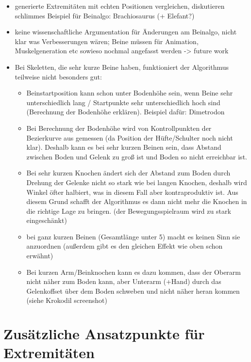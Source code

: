 \begin{itemize}
 \item generierte Extremitäten mit echten Positionen vergleichen, diskutieren\\
    schlimmes Beispiel für Beinalgo: Brachiosaurus (+ Elefant?)
 \item keine wissenschaftliche Argumentation für Änderungen am Beinalgo, nicht klar was Verbesserungen wären; Beine müssen für Animation, Muskelgeneration etc sowieso nochmal angefasst werden -> future work
 \item Bei Skeletten, die sehr kurze Beine haben, funktioniert der Algorithmus teilweise nicht besonders gut:
  \begin{itemize}
   \item Beinstartposition kann schon unter Bodenhöhe sein, wenn Beine sehr unterschiedlich lang / Startpunkte sehr unterschiedlich hoch sind (Berechnung der Bodenhöhe erklären). Beispiel dafür: Dimetrodon
   \item Bei Berechnung der Bodenhöhe wird von Kontrollpunkten der Bezierkurve aus gemessen (da Position der Hüfte/Schulter noch nicht klar). Deshalb kann es bei sehr kurzen Beinen sein, dass Abstand zwischen Boden und Gelenk zu groß ist und Boden so nicht erreichbar ist.
   \item Bei sehr kurzen Knochen ändert sich der Abstand zum Boden durch Drehung der Gelenke nicht so stark wie bei langen Knochen, deshalb wird Winkel öfter halbiert, was in diesem Fall aber kontraproduktiv ist. Aus diesem Grund schafft der Algorithmus es dann nicht mehr die Knochen in die richtige Lage zu bringen. (der Bewegungsspielraum wird zu stark eingeschänkt)
   \item bei ganz kurzen Beinen (Gesamtlänge unter 5) macht es keinen Sinn sie anzuordnen (außerdem gibt es den gleichen Effekt wie oben schon erwähnt)
   \item Bei kurzen Arm/Beinknochen kann es dazu kommen, dass der Oberarm nicht näher zum Boden kann, aber Unterarm (+Hand) durch das Gelenkoffset über dem Boden schweben und nicht näher heran kommen (siehe Krokodil screenshot)
  \end{itemize}
\end{itemize}

\section{Zusätzliche Ansatzpunkte für Extremitäten}

